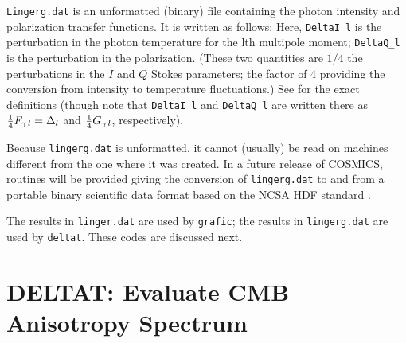 {\tt Lingerg.dat} is an unformatted (binary) file containing the photon
intensity and polarization transfer functions.  It is written as follows:
\hfil{}
Here, {\tt DeltaI\_l} is the perturbation in the photon temperature for
the lth multipole moment; {\tt DeltaQ\_l} is the perturbation in the
polarization.  (These two quantities are $1/4$ the perturbations in
the $I$ and $Q$ Stokes parameters; the factor of 4 providing the conversion
from intensity to temperature fluctuations.)  See \cite{mab1} for the
exact definitions (though note that {\tt DeltaI\_l} and {\tt DeltaQ\_l}
are written there as ${1\over4}F_{\gamma\,l}=\Delta_l$ and ${1\over4}
G_{\gamma\,l}$, respectively).

Because {\tt lingerg.dat} is unformatted, it cannot (usually) be read
on machines different from the one where it was created.  In a future
release of COSMICS, routines will be provided giving the conversion
of {\tt lingerg.dat} to and from a portable binary scientific data format
based on the NCSA HDF standard \cite{hdf}.

The results in {\tt linger.dat} are used by {\tt grafic}; the results in
{\tt lingerg.dat} are used by {\tt deltat}.  These codes are discussed next.


\section{DELTAT: Evaluate CMB Anisotropy Spectrum}

